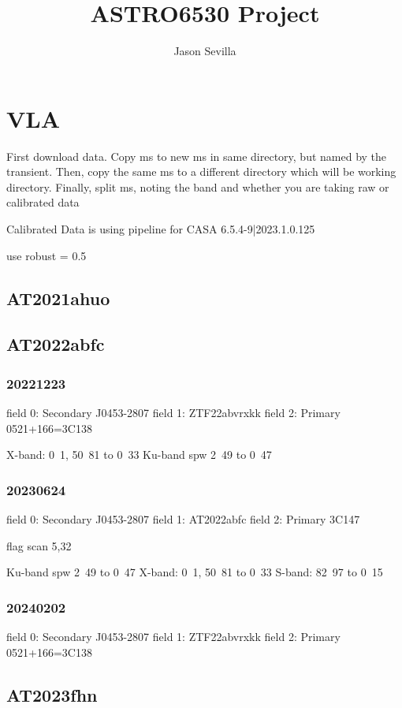\documentclass[twocolumn,twocolappendix]{aastex631}
\begin{document}
\title{ASTRO6530 Project}



\author{Jason Sevilla}





\section{VLA}
First download data.  Copy ms to new ms in same directory, but named by the transient.  Then, copy the same ms to a different directory which will be working directory.  Finally, split ms, noting the band and whether you are taking raw or calibrated data

Calibrated Data is using pipeline for CASA 6.5.4-9|2023.1.0.125

use robust = 0.5

\subsection{AT2021ahuo}

\subsection{AT2022abfc}

\subsubsection{20221223}
field 0: Secondary J0453-2807
field 1: ZTF22abvrxkk
field 2: Primary 0521+166=3C138

X-band: 0~1, 50~81 to 0~33
Ku-band spw 2~49 to 0~47



\subsubsection{20230624}
field 0: Secondary J0453-2807
field 1: AT2022abfc
field 2: Primary 3C147

flag scan 5,32

Ku-band spw 2~49 to 0~47
X-band: 0~1, 50~81 to 0~33
S-band: 82~97 to 0~15
\subsubsection{20240202}
field 0: Secondary J0453-2807
field 1: ZTF22abvrxkk
field 2: Primary 0521+166=3C138
\subsection{AT2023fhn}
\end{document}
